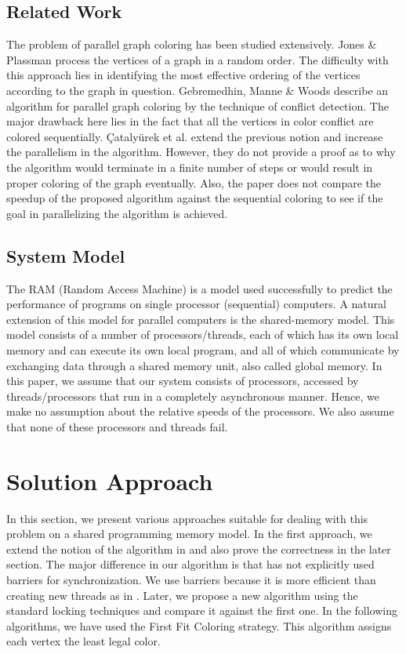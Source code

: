 \documentclass[a4paper,11pt]{article}
\begin{document}
\subsection{Related Work}
The problem of parallel graph coloring has been studied extensively. Jones \& Plassman \cite{DBLP:journals/siamsc/JonesP93} process the vertices of a graph in a random order. The difficulty with this approach lies in identifying the most effective ordering of the vertices according to the graph in question. Gebremedhin, Manne \& Woods  \cite{gebremedhin2006speeding} describe an algorithm for parallel graph coloring by the technique of conflict detection. The major drawback here lies in the fact that all the vertices in color conflict are colored sequentially. {\c{C}}ataly{\"{u}}rek et al. \cite{DBLP:journals/pc/CatalyurekFGHP12} extend the previous notion and increase the parallelism in the algorithm. However, they do not provide a proof as to why the algorithm would terminate in a finite number of steps or would result in proper coloring of the graph eventually. Also, the paper does not compare the speedup of the proposed algorithm against the sequential coloring to see if the goal in parallelizing the algorithm is achieved.
\subsection{System Model}
The RAM (Random Access Machine) is a model used successfully to predict the performance of programs on single processor (sequential) computers. A natural extension of this model for parallel computers is the shared-memory model. This model consists of a number of processors/threads, each of which has its own local memory and can execute its own local program, and all of which communicate by exchanging data through a shared memory unit, also called global memory. In this paper, we assume that our system consists of  processors, accessed by  threads/processors that run in a completely asynchronous manner. Hence, we make no assumption about the relative speeds of the processors. We also assume that none of these processors and threads fail.

\section{Solution Approach}
In this section, we present various approaches suitable for dealing with this problem on a shared programming memory model. In the first approach, we extend the notion of the algorithm in \cite{DBLP:journals/pc/CatalyurekFGHP12} and also prove the correctness in the later section. The major difference in our algorithm is that \cite{DBLP:journals/pc/CatalyurekFGHP12} has not explicitly used barriers for synchronization. We use barriers because it is more efficient than creating new threads as in \cite{DBLP:journals/pc/CatalyurekFGHP12}. Later, we propose a new algorithm using the standard locking techniques and compare it against the first one. In the following algorithms, we have used the First Fit Coloring strategy. This algorithm assigns each vertex the least legal color.
\end{document}
